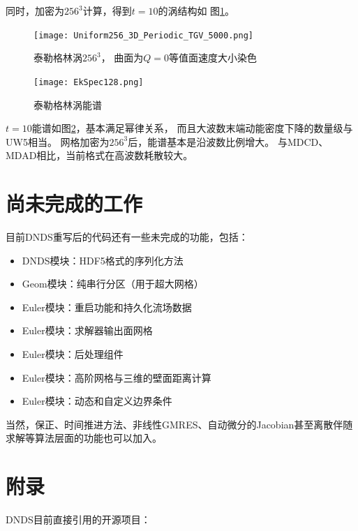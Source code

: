 \documentclass[UTF8,zihao=5]{ctexart} %
\begin{document}
同时，加密为$256^3$计算，得到$t=10$的涡结构如
图\ref{fig:Uniform256_3D_Periodic_TGV_5000}。

\begin{figure}[htbp]
    \centering
    \texttt{[image: Uniform256\_3D\_Periodic\_TGV\_5000.png]}  
    \caption{泰勒格林涡$256^3$，
    曲面为$Q=0$等值面速度大小染色}
    \label{fig:Uniform256_3D_Periodic_TGV_5000}
\end{figure}

\begin{figure}[htbp]
    \centering
    \texttt{[image: EkSpec128.png]} 
    \caption{泰勒格林涡能谱}
    \label{fig:EkSpec128}
\end{figure}

$t=10$能谱如图\ref{fig:EkSpec128}，基本满足幂律关系，
而且大波数末端动能密度下降的数量级与UW5相当。
网格加密为$256^3$后，能谱基本是沿波数比例增大。
与MDCD、MDAD相比，当前格式在高波数耗散较大。


\section{尚未完成的工作}

目前DNDS重写后的代码还有一些未完成的功能，包括：
\begin{itemize}
    \item DNDS模块：HDF5格式的序列化方法
    \item Geom模块：纯串行分区（用于超大网格）
    \item Euler模块：重启功能和持久化流场数据
    \item Euler模块：求解器输出面网格
    \item Euler模块：后处理组件
    \item Euler模块：高阶网格与三维的壁面距离计算
    \item Euler模块：动态和自定义边界条件
\end{itemize}

当然，保正、时间推进方法、非线性GMRES、自动微分的Jacobian甚至离散伴随求解等算法层面的功能也可以加入。





\newpage

\section*{附录}

DNDS目前直接引用的开源项目：
\end{document}
